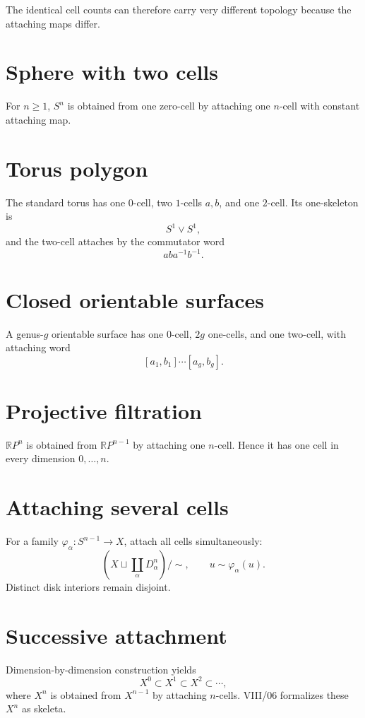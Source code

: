 The identical cell counts can therefore carry very different topology because
the attaching maps differ.

\section{Sphere with two cells}
\begin{proposition}\label{prop:viii05-sphere}
For \(n\ge1\), \(S^n\) is obtained from one zero-cell by attaching one
\(n\)-cell with constant attaching map.
\end{proposition}

\section{Torus polygon}
The standard torus has one \(0\)-cell, two \(1\)-cells \(a,b\), and one
\(2\)-cell.  Its one-skeleton is
\[
S^1\vee S^1,
\]
and the two-cell attaches by the commutator word
\[
aba^{-1}b^{-1}.
\]

\section{Closed orientable surfaces}
A genus-\(g\) orientable surface has one \(0\)-cell, \(2g\) one-cells, and one
two-cell, with attaching word
\[
[a_1,b_1]\cdots[a_g,b_g].
\]

\section{Projective filtration}
\begin{proposition}\label{prop:viii05-projective}
\(\mathbb RP^n\) is obtained from \(\mathbb RP^{n-1}\) by attaching one
\(n\)-cell.  Hence it has one cell in every dimension \(0,\dots,n\).
\end{proposition}

\section{Attaching several cells}
For a family \(\varphi_\alpha:S^{n-1}\to X\), attach all cells simultaneously:
\[
\left(X\sqcup\coprod_\alpha D^n_\alpha\right)/\!\sim,
\qquad
u\sim\varphi_\alpha(u).
\]
Distinct disk interiors remain disjoint.

\section{Successive attachment}
Dimension-by-dimension construction yields
\[
X^0\subset X^1\subset X^2\subset\cdots,
\]
where \(X^n\) is obtained from \(X^{n-1}\) by attaching \(n\)-cells.  VIII/06
formalizes these \(X^n\) as skeleta.

